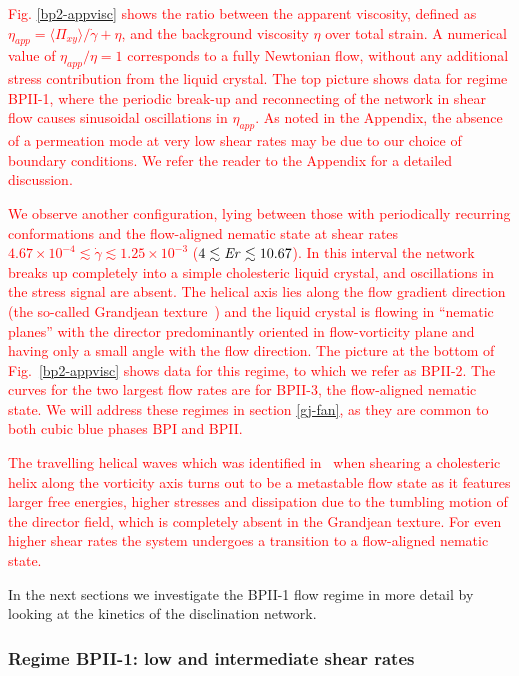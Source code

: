 \documentclass[8.5pt,twoside,twocolumn]{article}
\newcommand{\e}[1]{\times10^{#1}}
\newcommand{\gd}{\dot{\gamma}}
\newcommand{\rev}[1]{{\textcolor{red}{#1}}}
\begin{document}
\rev{
Fig. \ref{bp2-appvisc} shows the ratio between the apparent viscosity, 
defined as $\eta_{app}=\langle \Pi_{xy} \rangle/\gd +\eta$, and the background viscosity $\eta$ 
over total strain.
A numerical value of $\eta_{app}/\eta=1$ corresponds to a fully Newtonian flow,
without any additional stress contribution from the liquid crystal.
The top picture shows data for regime BPII-1, where the periodic break-up and reconnecting of the network 
in shear flow causes sinusoidal oscillations in $\eta_{app}$. As noted in the Appendix, the
absence of a permeation mode at very low shear rates may be due to our
choice of boundary conditions. We refer the reader to the Appendix for a detailed discussion.
}

\rev{
We observe another configuration, lying between those with periodically recurring conformations 
and the flow-aligned nematic state at shear rates $4.67\e{-4}\lesssim\gd\lesssim1.25\e{-3}$ ($4 \lesssim {\it Er} \lesssim 10.67$). 
In this interval the network breaks up completely into a simple cholesteric liquid crystal, and oscillations in the stress signal are absent.
The helical axis lies along the flow gradient direction (the so-called Grandjean texture~\cite{deGennes})
and the liquid crystal is flowing in ``nematic planes'' with the director predominantly oriented in flow-vorticity plane and having only
a small angle with the flow direction.
The picture at the bottom of Fig.~\ref{bp2-appvisc} shows data for this regime, to which we refer as BPII-2. The 
curves for the two largest flow rates are for BPII-3, the flow-aligned nematic state. 
We will address these regimes in section \ref{gj-fan}, as they are common to both cubic blue phases BPI and BPII.
}

\rev{
The travelling helical waves which was identified in~\cite{Rey:1996a,Rey:1996b} when shearing a cholesteric helix along
the vorticity axis turns out to be a metastable flow state as it features larger free energies, higher stresses and dissipation due 
to the tumbling motion of the director field, which is completely absent in the Grandjean texture.
For even higher shear rates the system undergoes a transition to a flow-aligned nematic state.
}

In the next sections we investigate the BPII-1 flow regime in more detail 
by looking at the kinetics of the disclination network.


\subsubsection{Regime BPII-1: low and intermediate shear rates }
\end{document}
